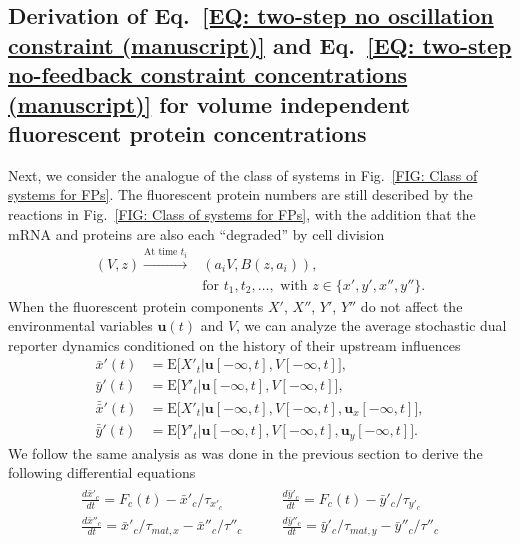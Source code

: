 \documentclass[%
 reprint,prx,
superscriptaddress,
%
%
%
%
%
%
%
%
%
 amsmath,amssymb,
 aps,
%
%
%
%
%
%
]{revtex4-2}
\newlength{\arrow}
\begin{document}
{{ 












\subsection{Derivation of Eq.~\eqref{EQ: two-step no oscillation constraint (manuscript)} and Eq.~\eqref{EQ: two-step no-feedback constraint concentrations (manuscript)} for volume independent fluorescent protein concentrations}

Next, we consider the analogue of the class of systems in Fig.~\ref{FIG: Class of systems for FPs}. The fluorescent protein numbers are still described by the reactions in Fig.~\ref{FIG: Class of systems for FPs}, with the addition that the mRNA and proteins are also each ``degraded'' by cell division
\begin{align*}
(V, z) \xrightarrow{\text{At time } t_{i}} &(a_{i}V,  B(z,a_{i})), \\
&\text{for } t_{1}, t_{2}, \dots, \text{ with } z \in \{x', y', x'', y''\}.
\end{align*}
When the fluorescent protein components $X'$, $X''$, $Y'$, $Y''$ do not affect the environmental variables $\mathbf{u}(t)$ and $V$, we 
can analyze the average stochastic dual reporter dynamics conditioned on the history of their upstream influences 
\begin{align*}
\bar{x}'(t) &= \mathrm{E}\big[X'_t|\mathbf{u}[-\infty,t], V[-\infty,t] \big], \\ \bar{y}'(t) &= \mathrm{E}\big[ Y'_t|\mathbf{u}[-\infty,t] , V[-\infty,t]\big], \\
\bar{\bar{x}}'(t) &= \mathrm{E}\big[X'_t|\mathbf{u}[-\infty,t], V[-\infty,t], \mathbf{u}_{x}[-\infty,t] \big], \\ \bar{\bar{y}}'(t) &= \mathrm{E}\big[ Y'_t|\mathbf{u}[-\infty,t] , V[-\infty,t], \mathbf{u}_{y}[-\infty,t]\big] .
\end{align*}
We follow the same analysis as was done in the previous section to derive the following differential equations 
\begin{align}
\begin{split}
 \frac{d\bar{x}'_{c}}{dt} = F_{c}(t) - \bar{x}'_{c}/\tau_{x'_{c}} \quad & \quad \frac{d\bar{y}'_{c}}{dt} = F_{c}(t) - \bar{y}'_{c}/\tau_{y'_{c}} \\
 \frac{d\bar{x}''_{c}}{dt} = \bar{x}'_{c}/\tau_{mat,x} - \bar{x}''_{c}/\tau''_{c} \quad & \quad \frac{d\bar{y}''_{c}}{dt} = \bar{y}'_{c}/\tau_{mat,y} - \bar{y}''_{c}/\tau''_{c} 

\end{split}
\end{align}}}
\end{document}
